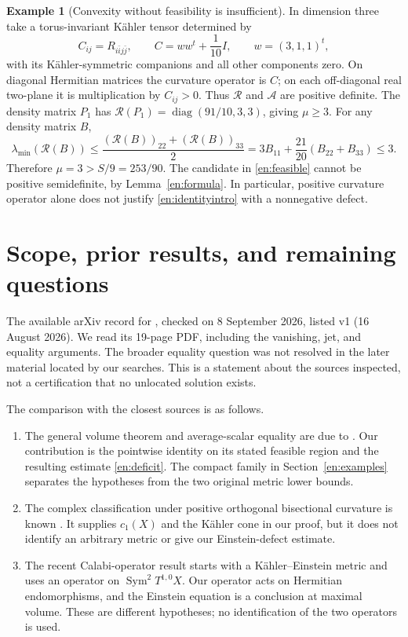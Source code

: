 \documentclass[12pt]{amsart}
\theoremstyle{definition}
\newtheorem{eg}[thm]{Example}
\theoremstyle{remark}
\numberwithin{equation}{section}
\DeclareMathOperator{\Sym}{Sym}
\theoremstyle{plain}
\theoremstyle{remark}
\theoremstyle{definition}
\begin{document}
\begin{eg}[Convexity without feasibility is insufficient]\label{en:boundary}
In dimension three take a torus-invariant K\"ahler tensor determined by
\[
 C_{ij}=R_{i\bar i j\bar j},\qquad
 C=ww^t+\frac1{10}I,\qquad w=(3,1,1)^t,
\]
with its K\"ahler-symmetric companions and all other components zero.
On diagonal Hermitian matrices the curvature operator is $C$; on each
off-diagonal real two-plane it is multiplication by $C_{ij}>0$.
Thus $\mathscr R$ and $\mathcal A$ are positive definite.
The density matrix $P_1$ has
$\mathscr R(P_1)=\operatorname{diag}(91/10,3,3)$, giving $\mu\geq3$.
For any density matrix $B$,
\[
 \lambda_{\min}(\mathscr R(B))
 \leq\frac{(\mathscr R(B))_{22}+(\mathscr R(B))_{33}}2
 =3B_{11}+\frac{21}{20}(B_{22}+B_{33})\leq3.
\]
Therefore $\mu=3>S/9=253/90$. The candidate in \eqref{en:feasible}
cannot be positive semidefinite, by Lemma~\ref{en:formula}.
In particular, positive curvature operator alone does not justify
\eqref{en:identityintro} with a nonnegative defect.
\end{eg}

\section{Scope, prior results, and remaining questions}

The available arXiv record for \cite{en:DS}, checked on 8 September 2026,
listed v1 (16 August 2026). We read its 19-page PDF, including the
vanishing, jet, and equality arguments. The broader equality question
was not resolved in the later material located by our searches. This is
a statement about the sources inspected, not a certification that no
unlocated solution exists.

The comparison with the closest sources is as follows.
\begin{enumerate}
\item The general volume theorem and average-scalar equality are due to
\cite{en:DS}. Our contribution is the pointwise identity on its stated
feasible region and the resulting estimate \eqref{en:deficit}. The
compact family in Section~\ref{en:examples} separates the hypotheses
from the two original metric lower bounds.
\item The complex classification under positive orthogonal bisectional
curvature is known \cite{en:FLW}. It supplies $c_1(X)$ and the K\"ahler
cone in our proof, but it does not identify an arbitrary metric or give
our Einstein-defect estimate.
\item The recent Calabi-operator result \cite[Theorem 1.4]{en:DFL}
starts with a K\"ahler--Einstein metric and uses an operator on
$\Sym^2T^{1,0}X$. Our operator acts on Hermitian endomorphisms, and
the Einstein equation is a conclusion at maximal volume.
These are different hypotheses; no identification of the two operators
is used.
\end{enumerate}
\end{document}
